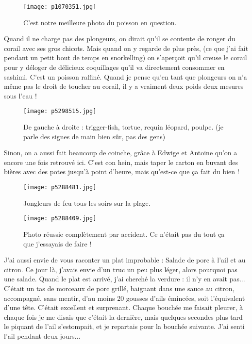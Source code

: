 \documentclass{book}
\begin{document}
\begin{figure}[h]
\centering
\texttt{[image: p1070351.jpg]}
\caption*{C'est notre meilleure photo du poisson en question.}
\end{figure}

Quand il ne charge pas des plongeurs, on dirait qu'il se contente de ronger du corail avec ses gros chicots. Mais quand on y regarde de plus près, (ce que j'ai fait pendant un petit bout de temps en snorkelling) on s'aperçoit qu'il creuse le corail pour y déloger de délicieux coquillages qu'il va directement consommer en sashimi. C'est un poisson raffiné. Quand je pense qu'en tant que plongeurs on n'a même pas le droit de toucher au corail, il y a vraiment deux poids deux mesures sous l'eau !


\begin{figure}[h]
\centering
\texttt{[image: p5298515.jpg]}
\caption*{De gauche à droite : trigger-fish, tortue, requin léopard, poulpe. (je parle des signes de main bien sûr, pas des gens)}
\end{figure}

Sinon, on a aussi fait beaucoup de coinche, grâce à Edwige et Antoine qu'on a encore une fois retrouvé ici. C'est con hein, mais taper le carton en buvant des bières avec des potes jusqu'à point d'heure, mais qu'est-ce que ça fait du bien !


\begin{figure}[h]
\centering
\texttt{[image: p5288481.jpg]}
\caption*{Jongleurs de feu tous les soirs sur la plage.}
\end{figure}


\begin{figure}[h]
\centering
\texttt{[image: p5288409.jpg]}
\caption*{Photo réussie complètement par accident. Ce n'était pas du tout ça que j'essayais de faire !}
\end{figure}

J'ai aussi envie de vous raconter un plat improbable : Salade de porc à l'ail et au citron. Ce jour là, j'avais envie d'un truc un peu plus léger, alors pourquoi pas une salade. Quand le plat est arrivé, j'ai cherché la verdure : il n'y en avait pas... C'était un tas de morceaux de porc grillé, baignant dans une sauce au citron, accompagné, sans mentir, d'au moins 20 gousses d'ails émincées, soit l'équivalent d'une tête. C'était excellent et surprenant. Chaque bouchée me faisait pleurer, à chaque fois je me disais que c'était la dernière, mais quelques secondes plus tard le piquant de l'ail s'estompait, et je repartais pour la bouchée suivante. J'ai senti l'ail pendant deux jours...
\end{document}
